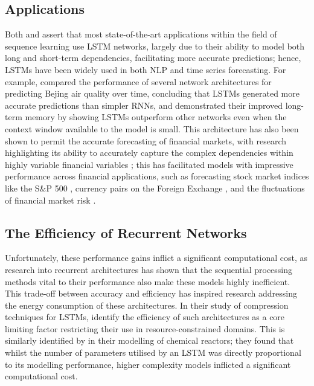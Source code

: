 \documentclass[a4paper, 11pt]{report}
\begin{document}
    \subsection{Applications}

    Both \citet{lipton-2015} and \citet{yu-2019} assert that most state-of-the-art applications within the field of sequence learning use LSTM networks, largely due to their ability to model both long and short-term dependencies, facilitating more accurate predictions; hence, LSTMs have been widely used in both NLP and time series forecasting. For example, \citet{shi-2022} compared the performance of several network architectures for predicting Bejing air quality over time, concluding that LSTMs generated more accurate predictions than simpler RNNs, and demonstrated their improved long-term memory by showing LSTMs outperform other networks even when the context window available to the model is small. This architecture has also been shown to permit the accurate forecasting of financial markets, with research highlighting its ability to accurately capture the complex dependencies within highly variable financial variables \citep{li-2017}; this has facilitated models with impressive performance across financial applications, such as forecasting stock market indices like the S\&P 500 \citep{fjellstrom-2022}, currency pairs on the Foreign Exchange \citep{qi-2021}, and the fluctuations of financial market risk \citep{du-2019}.


    \subsection{The Efficiency of Recurrent Networks}

    Unfortunately, these performance gains inflict a significant computational cost, as research into recurrent architectures has shown that the sequential processing methods vital to their performance also make these models highly inefficient. This trade-off between accuracy and efficiency has inspired research addressing the energy consumption of these architectures. In their study of compression techniques for LSTMs, \citet{wang-2018} identify the efficiency of such architectures as a core limiting factor restricting their use in resource-constrained domains. This is similarly identified by \citet{zarzycki-2021} in their modelling of chemical reactors; they found that whilst the number of parameters utilised by an LSTM was directly proportional to its modelling performance, higher complexity models inflicted a significant computational cost. 
\end{document}
